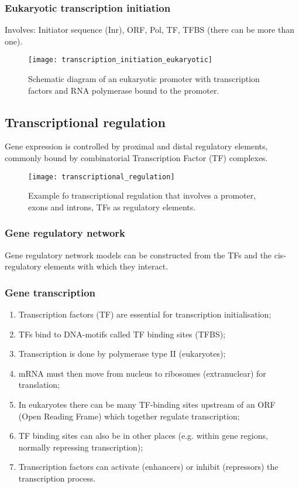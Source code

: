 \subsubsection{Eukaryotic transcription initiation}

Involves: Initiator sequence (Inr), ORF, Pol, TF, TFBS (there can be more than one).

\begin{figure}
\centering
\texttt{[image: transcription\_initiation\_eukaryotic]}
\caption{Schematic diagram of an eukaryotic promoter with transcription factors and RNA polymerase bound to the promoter.}
\label{Transcritpion initiation in eukaryotes}
\end{figure}

\subsection{Transcriptional regulation}

Gene expression is controlled by proximal and distal regulatory elements, 
commonly bound by combinatorial Transcription Factor (TF) complexes.

\begin{figure}
\centering
\texttt{[image: transcriptional\_regulation]}
\caption{Example fo transcriptional regulation that involves a promoter, exons 
and introns, TFs as regulatory elements.}
\label{Transcritpion initiation in eukaryotes}
\end{figure}

\subsubsection{Gene regulatory network}

Gene regulatory network models can be constructed from the TFs and the 
cis-regulatory elements with which they interact.

\subsubsection{Gene transcription}

\begin{enumerate}
\item Transcription factors (TF) are essential for transcription initialisation;
\item TFs bind to DNA-motifs called TF binding sites (TFBS);
\item Transcription is done by polymerase type II (eukaryotes);
\item mRNA must then move from nucleus to ribosomes (extranuclear) for translation;
\item In eukaryotes there can be many TF-binding sites upstream of an ORF 
(Open Reading Frame) which together regulate transcription;
\item TF binding sites can also be in other places (e.g. within gene regions, 
normally repressing transcription);
\item Transcription factors can activate (enhancers) or inhibit
(repressors) the transcription process.
\end{enumerate}

